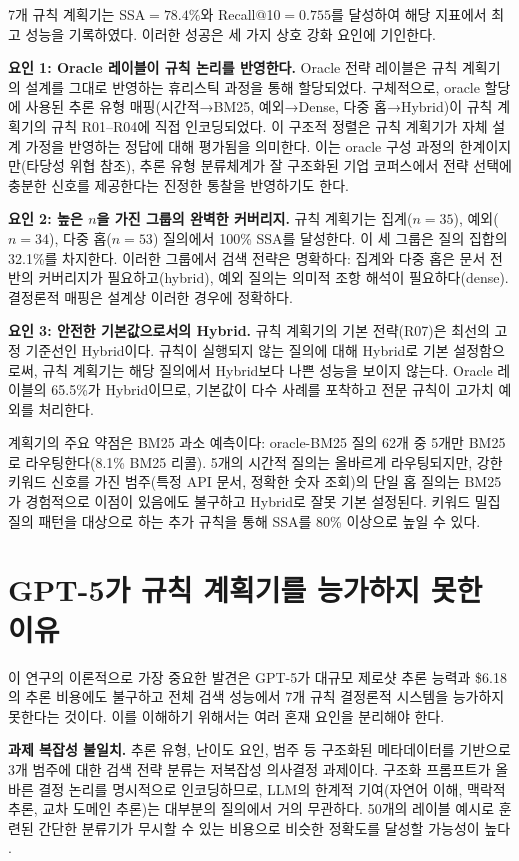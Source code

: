 7개 규칙 계획기는 SSA$={78.4\%}$와 Recall@10$={0.755}$를 달성하여 해당 지표에서 최고 성능을 기록하였다. 이러한 성공은 세 가지 상호 강화 요인에 기인한다.

\textbf{요인 1: Oracle 레이블이 규칙 논리를 반영한다.} Oracle 전략 레이블은 규칙 계획기의 설계를 그대로 반영하는 휴리스틱 과정을 통해 할당되었다. 구체적으로, oracle 할당에 사용된 추론 유형 매핑(시간적→BM25, 예외→Dense, 다중 홉→Hybrid)이 규칙 계획기의 규칙 R01--R04에 직접 인코딩되었다. 이 구조적 정렬은 규칙 계획기가 자체 설계 가정을 반영하는 정답에 대해 평가됨을 의미한다. 이는 oracle 구성 과정의 한계이지만(타당성 위협 참조), 추론 유형 분류체계가 잘 구조화된 기업 코퍼스에서 전략 선택에 충분한 신호를 제공한다는 진정한 통찰을 반영하기도 한다.

\textbf{요인 2: 높은 $n$을 가진 그룹의 완벽한 커버리지.} 규칙 계획기는 집계($n{=}35$), 예외($n{=}34$), 다중 홉($n{=}53$) 질의에서 100\% SSA를 달성한다. 이 세 그룹은 질의 집합의 32.1\%를 차지한다. 이러한 그룹에서 검색 전략은 명확하다: 집계와 다중 홉은 문서 전반의 커버리지가 필요하고(hybrid), 예외 질의는 의미적 조항 해석이 필요하다(dense). 결정론적 매핑은 설계상 이러한 경우에 정확하다.

\textbf{요인 3: 안전한 기본값으로서의 Hybrid.} 규칙 계획기의 기본 전략(R07)은 최선의 고정 기준선인 Hybrid이다. 규칙이 실행되지 않는 질의에 대해 Hybrid로 기본 설정함으로써, 규칙 계획기는 해당 질의에서 Hybrid보다 나쁜 성능을 보이지 않는다. Oracle 레이블의 65.5\%가 Hybrid이므로, 기본값이 다수 사례를 포착하고 전문 규칙이 고가치 예외를 처리한다.

계획기의 주요 약점은 BM25 과소 예측이다: oracle-BM25 질의 62개 중 5개만 BM25로 라우팅한다(8.1\% BM25 리콜). 5개의 시간적 질의는 올바르게 라우팅되지만, 강한 키워드 신호를 가진 범주(특정 API 문서, 정확한 숫자 조회)의 단일 홉 질의는 BM25가 경험적으로 이점이 있음에도 불구하고 Hybrid로 잘못 기본 설정된다. 키워드 밀집 질의 패턴을 대상으로 하는 추가 규칙을 통해 SSA를 80\% 이상으로 높일 수 있다.

\section{GPT-5가 규칙 계획기를 능가하지 못한 이유}
\label{sec:disc_gpt5_ko}

이 연구의 이론적으로 가장 중요한 발견은 GPT-5가 대규모 제로샷 추론 능력과 \$6.18의 추론 비용에도 불구하고 전체 검색 성능에서 7개 규칙 결정론적 시스템을 능가하지 못한다는 것이다. 이를 이해하기 위해서는 여러 혼재 요인을 분리해야 한다.

\textbf{과제 복잡성 불일치.} 추론 유형, 난이도 요인, 범주 등 구조화된 메타데이터를 기반으로 3개 범주에 대한 검색 전략 분류는 저복잡성 의사결정 과제이다. 구조화 프롬프트가 올바른 결정 논리를 명시적으로 인코딩하므로, LLM의 한계적 기여(자연어 이해, 맥락적 추론, 교차 도메인 추론)는 대부분의 질의에서 거의 무관하다. 50개의 레이블 예시로 훈련된 간단한 분류기가 무시할 수 있는 비용으로 비슷한 정확도를 달성할 가능성이 높다 \citep{shi2023large}.


